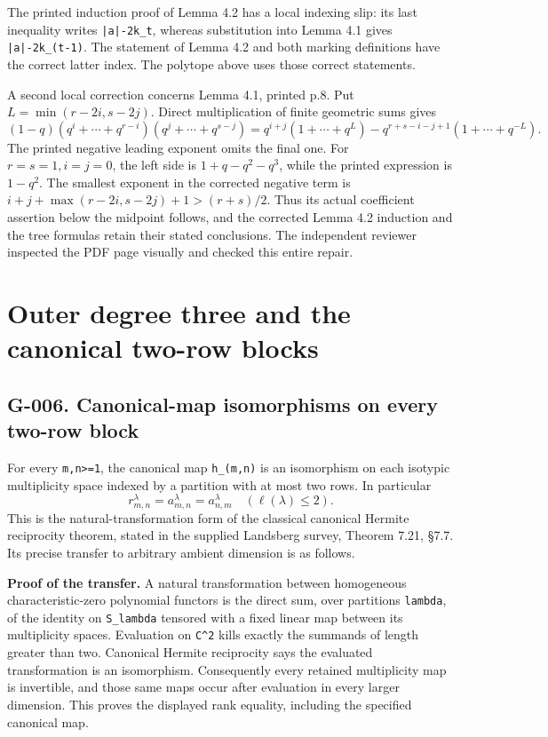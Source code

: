 \documentclass[
  10pt,
]{article}
\begin{document}
The printed induction proof of Lemma 4.2 has a local indexing slip: its
last inequality writes
\texttt{\small |a|-\allowbreak{}2k\_\allowbreak{}t}, whereas
substitution into Lemma 4.1 gives
\texttt{\small |a|-\allowbreak{}2k\_\allowbreak{}(\allowbreak{}t-\allowbreak{}1)\allowbreak{}}.
The statement of Lemma 4.2 and both marking definitions have the correct
latter index. The polytope above uses those correct statements.

A second local correction concerns Lemma 4.1, printed p.8. Put
\(L=\min(r-2i,s-2j)\). Direct multiplication of finite geometric sums
gives \[
(1-q)(q^i+\cdots+q^{r-i})(q^j+\cdots+q^{s-j})
=q^{i+j}(1+\cdots+q^L)-q^{r+s-i-j+1}(1+\cdots+q^{-L}).
\] The printed negative leading exponent omits the final one. For
\(r=s=1,i=j=0\), the left side is \(1+q-q^2-q^3\), while the printed
expression is \(1-q^2\). The smallest exponent in the corrected negative
term is \(i+j+\max(r-2i,s-2j)+1>(r+s)/2\). Thus its actual coefficient
assertion below the midpoint follows, and the corrected Lemma 4.2
induction and the tree formulas retain their stated conclusions. The
independent reviewer inspected the PDF page visually and checked this
entire repair.

\section{Outer degree three and the canonical two-row
blocks}\label{outer-degree-three-and-the-canonical-two-row-blocks}

\subsection{G-006. Canonical-map isomorphisms on every two-row
block}\label{g-006.-canonical-map-isomorphisms-on-every-two-row-block}

For every \texttt{\small m,\allowbreak{}n>=\allowbreak{}1}, the
canonical map
\texttt{\small h\_\allowbreak{}(\allowbreak{}m,\allowbreak{}n)\allowbreak{}}
is an isomorphism on each isotypic multiplicity space indexed by a
partition with at most two rows. In particular \[
r_{m,n}^{\lambda}=a_{m,n}^{\lambda}=a_{n,m}^{\lambda}
\quad(\ell(\lambda)\le2).
\] This is the natural-transformation form of the classical canonical
Hermite reciprocity theorem, stated in the supplied Landsberg survey,
Theorem 7.21, §7.7. Its precise transfer to arbitrary ambient dimension
is as follows.

\textbf{Proof of the transfer.} A natural transformation between
homogeneous characteristic-zero polynomial functors is the direct sum,
over partitions \texttt{\small lambda}, of the identity on
\texttt{\small S\_\allowbreak{}lambda} tensored with a fixed linear map
between its multiplicity spaces. Evaluation on
\texttt{\small C\textasciicircum{}2} kills exactly the summands of
length greater than two. Canonical Hermite reciprocity says the
evaluated transformation is an isomorphism. Consequently every retained
multiplicity map is invertible, and those same maps occur after
evaluation in every larger dimension. This proves the displayed rank
equality, including the specified canonical map.
\end{document}
